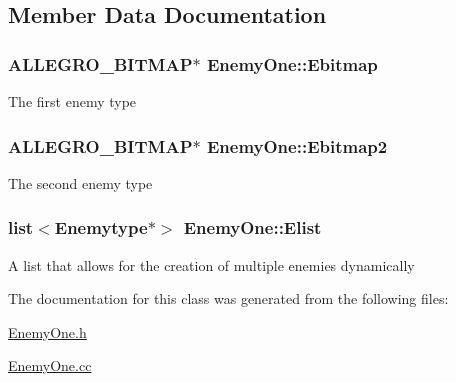 \subsection{Member Data Documentation}
\hypertarget{classEnemyOne_a186a44174a5f8c35d805209c1806d967}{
\subsubsection[{Ebitmap}]{\setlength{\rightskip}{0pt plus 5cm}ALLEGRO\_\-BITMAP$\ast$ {\bf EnemyOne::Ebitmap}}}
\label{classEnemyOne_a186a44174a5f8c35d805209c1806d967}
The first enemy type \hypertarget{classEnemyOne_ab42c5298a1849dd5a422dfaa1dc0f459}{
\subsubsection[{Ebitmap2}]{\setlength{\rightskip}{0pt plus 5cm}ALLEGRO\_\-BITMAP$\ast$ {\bf EnemyOne::Ebitmap2}}}
\label{classEnemyOne_ab42c5298a1849dd5a422dfaa1dc0f459}
The second enemy type \hypertarget{classEnemyOne_a1e46e43f2fe68dad65a79d57671159b6}{
\subsubsection[{Elist}]{\setlength{\rightskip}{0pt plus 5cm}list$<${\bf Enemytype}$\ast$$>$ {\bf EnemyOne::Elist}}}
\label{classEnemyOne_a1e46e43f2fe68dad65a79d57671159b6}
A list that allows for the creation of multiple enemies dynamically 

The documentation for this class was generated from the following files:\begin{DoxyCompactItemize}
\item 
\hyperlink{EnemyOne_8h}{EnemyOne.h}\item 
\hyperlink{EnemyOne_8cc}{EnemyOne.cc}\end{DoxyCompactItemize}
